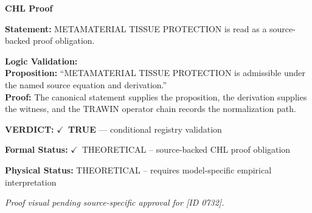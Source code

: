 \vspace{0.45em}
\noindent\textbf{CHL Proof}\par
\textbf{Statement:} METAMATERIAL TISSUE PROTECTION is read as a source-backed proof obligation.

\textbf{Logic Validation:}\\
\textbf{Proposition:} ``METAMATERIAL TISSUE PROTECTION is admissible under the named source equation and derivation.''\\
\textbf{Proof:} The canonical statement supplies the proposition, the derivation supplies the witness, and the TRAWIN operator chain records the normalization path.

\textbf{VERDICT:} \ensuremath{\checkmark}\ \textbf{TRUE} --- conditional registry validation

\textbf{Formal Status:} \ensuremath{\checkmark}\ THEORETICAL -- source-backed CHL proof obligation

\textbf{Physical Status:} THEORETICAL -- requires model-specific empirical interpretation
\par\vspace{0.45em}
\par
\vfill
\begingroup\footnotesize\itshape
Proof visual pending source-specific approval for [ID 0732].
\par\endgroup
\vfill
\endgroup
\endgroup
